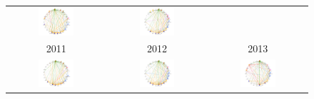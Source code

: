 \begin{figure}[H]
\begin{tabular}{ccc}
		\includegraphics[width=0.38\textwidth]{Imagens/rede-agr-AL-2012.pdf} &   \includegraphics[width=0.38\textwidth]{Imagens/rede-agr-AL-2013.pdf} \\
		2011 & 2012 & 2013\\[6pt]
		\includegraphics[width=0.38\textwidth]{Imagens/rede-agr-AL-2014.pdf} &
		\includegraphics[width=0.38\textwidth]{Imagens/rede-agr-AL-2015.pdf} &
		\includegraphics[width=0.38\textwidth]{Imagens/rede-agr-AL-2016.pdf} \\

\end{tabular}
\end{figure}
